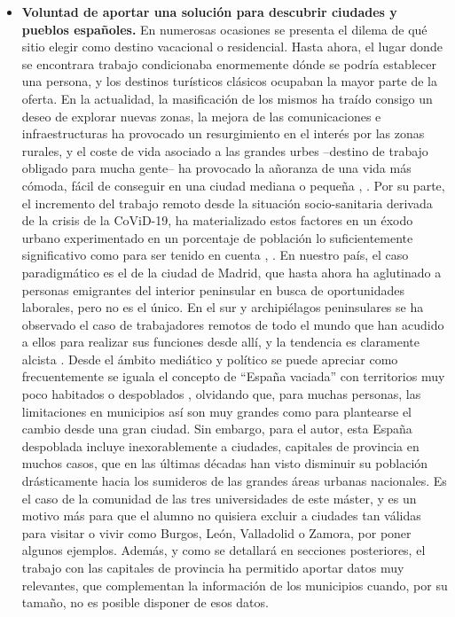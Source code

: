 \begin{itemize}
    \item \textbf{Voluntad de aportar una solución para descubrir ciudades y pueblos españoles.} En numerosas ocasiones se presenta el dilema de qué sitio elegir como destino vacacional o residencial. Hasta ahora, el lugar donde se encontrara trabajo condicionaba enormemente dónde se podría establecer una persona, y los destinos turísticos clásicos ocupaban la mayor parte de la oferta. En la actualidad, la masificación de los mismos ha traído consigo un deseo de explorar nuevas zonas, la mejora de las comunicaciones e infraestructuras ha provocado un resurgimiento en el interés por las zonas rurales, y el coste de vida asociado a las grandes urbes –destino de trabajo obligado para mucha gente– ha provocado la añoranza de una vida más cómoda, fácil de conseguir en una ciudad mediana o pequeña \cite{elpais}, \cite{terrenos}. Por su parte, el incremento del trabajo remoto desde la situación socio-sanitaria derivada de la crisis de la CoViD-19, ha materializado estos factores en un éxodo urbano experimentado en un porcentaje de población lo suficientemente significativo como para ser tenido en cuenta \cite{innovando}, \cite{20mins}. En nuestro país, el caso paradigmático es el de la ciudad de Madrid, que hasta ahora ha aglutinado a personas emigrantes del interior peninsular en busca de oportunidades laborales, pero no es el único. En el sur y archipiélagos peninsulares se ha observado el caso de trabajadores remotos de todo el mundo que han acudido a ellos para realizar sus funciones desde allí, y la tendencia es claramente alcista \cite{expansion}. Desde el ámbito mediático y político se puede apreciar como frecuentemente se iguala el concepto de ``España vaciada'' con territorios muy poco habitados o despoblados \cite{muycomputerpro}, olvidando que, para muchas personas, las limitaciones en municipios así son muy grandes como para plantearse el cambio desde una gran ciudad. Sin embargo, para el autor, esta España despoblada incluye inexorablemente a ciudades, capitales de provincia en muchos casos, que en las últimas décadas han visto disminuir su población drásticamente hacia los sumideros de las grandes áreas urbanas nacionales. Es el caso de la comunidad de las tres universidades de este máster, y es un motivo más para que el alumno no quisiera excluir a ciudades tan válidas para visitar o vivir como Burgos, León, Valladolid o Zamora, por poner algunos ejemplos. Además, y como se detallará en secciones posteriores, el trabajo con las capitales de provincia ha permitido aportar datos muy relevantes, que complementan la información de los municipios cuando, por su tamaño, no es posible disponer de esos datos.

\end{itemize}
